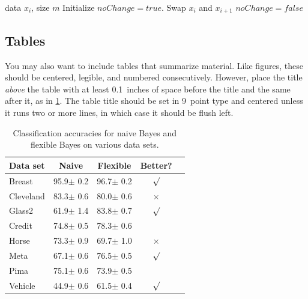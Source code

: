 \documentclass{article}
\theoremstyle{plain}
\theoremstyle{definition}
\theoremstyle{remark}
\begin{document}
\begin{algorithm}[tb]
  \caption{Bubble Sort}
  \label{alg:example}
  \begin{algorithmic}
     data $x_i$, size $m$
    \REPEAT
    \STATE Initialize $noChange = true$.
    \STATE Swap $x_i$ and $x_{i+1}$
    \STATE $noChange = false$
    \ENDIF
    \ENDFOR
  \end{algorithmic}
\end{algorithm}


\subsection{Tables}

You may also want to include tables that summarize material. Like figures,
these should be centered, legible, and numbered consecutively. However, place
the title \emph{above} the table with at least 0.1~inches of space before the
title and the same after it, as in \cref{sample-table}. The table title should
be set in 9~point type and centered unless it runs two or more lines, in which
case it should be flush left.


\begin{table}[t]
  \caption{Classification accuracies for naive Bayes and flexible
    Bayes on various data sets.}
  \label{sample-table}
  \begin{center}
    \begin{small}
      \begin{sc}
        \begin{tabular}{lcccr}
          \toprule
          Data set  & Naive         & Flexible      & Better?  \\
          \midrule
          Breast    & 95.9$\pm$ 0.2 & 96.7$\pm$ 0.2 & $\surd$  \\
          Cleveland & 83.3$\pm$ 0.6 & 80.0$\pm$ 0.6 & $\times$ \\
          Glass2    & 61.9$\pm$ 1.4 & 83.8$\pm$ 0.7 & $\surd$  \\
          Credit    & 74.8$\pm$ 0.5 & 78.3$\pm$ 0.6 &          \\
          Horse     & 73.3$\pm$ 0.9 & 69.7$\pm$ 1.0 & $\times$ \\
          Meta      & 67.1$\pm$ 0.6 & 76.5$\pm$ 0.5 & $\surd$  \\
          Pima      & 75.1$\pm$ 0.6 & 73.9$\pm$ 0.5 &          \\
          Vehicle   & 44.9$\pm$ 0.6 & 61.5$\pm$ 0.4 & $\surd$  \\
          \bottomrule
        \end{tabular}
      \end{sc}
    \end{small}
  \end{center}
  \vskip -0.1in
\end{table}
\end{document}
